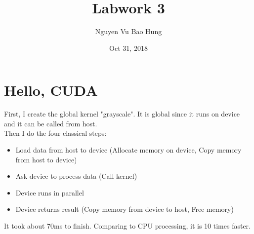\documentclass{article}
\title{Labwork 3}
\author{Nguyen Vu Bao Hung}
\date{Oct 31, 2018}
\begin{document}
\maketitle

\section{Hello, CUDA}
First, I create the global kernel "grayscale". It is global since it runs on device and it can be called from host.\\
Then I do the four classical steps:
\begin{itemize}
  \item Load data from host to device (Allocate memory on device, Copy memory from host to device)
  \item Ask device to process data (Call kernel)
  \item Device runs in parallel
  \item Device returns result (Copy memory from device to host, Free memory)
\end{itemize}
It took about 70ms to finish. Comparing to CPU processing, it is 10 times faster.
\end{document}
